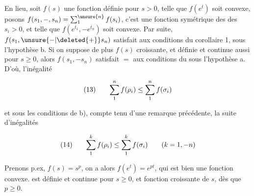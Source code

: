
En  lieu, soit $f(s)$ une fonction définie pour $s>0$, telle que $f(e^t)$ soit convexe, posons $f(s_1,\mathord{-},s_n)=\sum_1^{\unsure{n}} f(s_i)$, c'est une fonction symétrique des  des $s_i>0$, et telle que $f(e^{t_1},\mathord{-}e^{t_n})$ soit convexe. Par suite,  $f(s_1,\unsure{\mathord{-}|\deleted{+}}s_n)$ satisfait aux conditions du corollaire 1, sous l'hypothèse b. Si on suppose de plus $f(s)$ croissante, et définie et continue aussi pour $s\geq0$, alors $f(s_1,\mathord{-}s_n)$ satisfait $=$ aux conditions du  sous l'hypothèse a. D'où,    l'inégalité

\[
\begin{array}{@{}l@{\qquad}l@{}}
(13)&\displaystyle \sum_1^n f(\rho_i)\leq\sum_1^n f(\sigma_i)
\end{array}
\]

et sous les conditions de b), compte tenu d'une remarque précédente, la suite d'inégalités

\[
\begin{array}{@{}l@{\qquad}l@{}}
(14)&\displaystyle \sum_1^k f(\rho_i)\leq\sum_1^k f(\sigma_i)\qquad(k=1,\mathord{-}n)
\end{array}
\]

Prenons p.ex,  $f(s)=s^p$,  on a alors $f(e^t)=e^{pt}$, qui est bien une fonction convexe.  est définie et  continue pour $s\geq0$, et  fonction croissante de $s$, dès que $p\geq0$. 

{\reversemarginpar{}}
